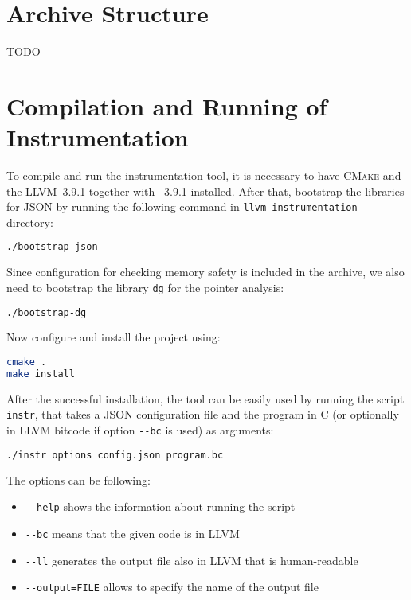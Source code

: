 
\section{Archive Structure}

TODO

\section{Compilation and Running of Instrumentation}

To compile and run the instrumentation tool, it is necessary to have
\textsc{CMake} and the LLVM~3.9.1 together with \clang~3.9.1 installed. After
that, bootstrap the libraries for JSON by running the following command in
\texttt{llvm-instrumentation} directory:

\begin{lstlisting}[language=bash]
./bootstrap-json
\end{lstlisting}

\noindent Since configuration for checking memory safety is included in the archive, we
also need to bootstrap the library \texttt{dg} for the pointer analysis:

\begin{lstlisting}[language=bash]
./bootstrap-dg
\end{lstlisting}

\noindent Now configure and install the project using:

\begin{lstlisting}[language=bash]
cmake .
make install
\end{lstlisting}

\noindent After the successful installation, the tool can be easily used by
running the script \texttt{instr}, that takes a JSON configuration file and the
program in C (or optionally in LLVM bitcode if option \texttt{-{}-bc} is used)
as arguments:

\begin{lstlisting}[language=bash]
./instr options config.json program.bc
\end{lstlisting}

\noindent The options can be following:
\begin{itemize}
  \item \texttt{-{}-help} shows the information about running the script
  \item \texttt{-{}-bc} means that the given code is in LLVM
  \item \texttt{-{}-ll} generates the output file also in LLVM that is human-readable
  \item \texttt{-{}-output=FILE} allows to specify the name of the output file
\end{itemize}

